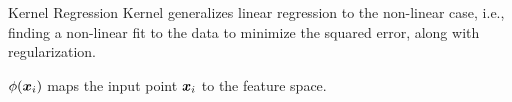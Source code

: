 %
%
%

\ifdefined\wox \begin{frame} \titlepage \end{frame} \fi

\begin{frame}{Kernel Regression}
%
Kernel generalizes linear regression to the non-linear
case, i.e., finding a non-linear fit to the data to minimize the squared
error, along with regularization. 

%
$\phi ({\boldsymbol x}_i)$ maps the input point ${\boldsymbol x}_i$ to the feature
space.
%
%

\medskip


\end{frame}
